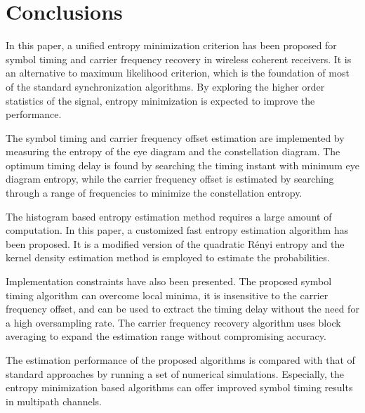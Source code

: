 \documentclass[journal,comsoc]{IEEEtran}
\begin{document}


\section{Conclusions}
\label{sec:conc}
In this paper, a unified entropy minimization criterion has been proposed for symbol timing and carrier frequency recovery in wireless coherent receivers.
It is an alternative to maximum likelihood criterion, which is the foundation of most of the standard synchronization algorithms. 
By exploring the higher order statistics of the signal, entropy minimization is expected to improve the performance. 

The symbol timing and carrier frequency offset estimation are implemented by measuring the entropy of the eye diagram and the constellation diagram.
% 
% 
The optimum timing delay is found by searching the timing instant with minimum eye diagram entropy, while the carrier frequency offset is estimated by searching through a range of frequencies to minimize the constellation entropy.  

The histogram based entropy estimation method requires a large amount of computation.
In this paper, a customized fast entropy estimation algorithm has been proposed.
It is a modified version of the quadratic R\'enyi entropy and the kernel density estimation method is employed to estimate the probabilities.

Implementation constraints have also been presented. 
The proposed symbol timing algorithm can overcome local minima, it is  insensitive to the carrier frequency offset, and can be used to extract the timing delay without the need for a high oversampling rate.
The carrier frequency recovery algorithm uses block averaging to expand the estimation range without compromising accuracy. 

The estimation performance of the proposed algorithms is compared with that of standard approaches by running a set of numerical simulations.
Especially, the entropy minimization based algorithms can offer improved symbol timing results in multipath channels.
% 
% 


\end{document}

